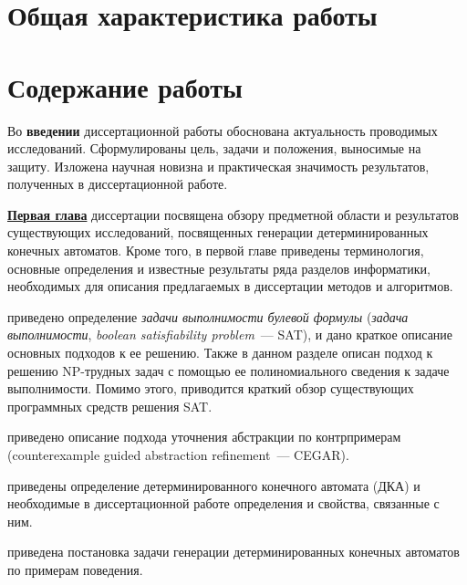 
\section*{Общая характеристика работы} %



\section*{Содержание работы}

Во \textbf{введении} диссертационной работы обоснована актуальность проводимых исследований. Сформулированы цель, задачи и положения, выносимые на защиту. Изложена научная новизна и практическая значимость результатов, полученных в диссертационной работе.


\textbf{\underline{Первая глава}} диссертации посвящена обзору предметной области и результатов существующих исследований, посвященных генерации детерминированных конечных автоматов.
Кроме того, в первой главе приведены терминология, основные определения и известные результаты ряда разделов информатики, необходимых для описания предлагаемых в диссертации методов и алгоритмов.

\insection{\ref{sec:review:sat}} приведено определение \emph{задачи выполнимости булевой формулы} (\emph{задача выполнимости}, \emph{boolean satisfiability problem}~{---} SAT), и дано краткое описание основных подходов к ее решению. 
Также в данном разделе описан подход к решению NP-трудных задач с помощью ее полиномиального сведения к задаче выполнимости.
Помимо этого, приводится краткий обзор существующих программных средств решения SAT.

\insection{\ref{sec:review:cegar}} приведено описание подхода уточнения абстракции по контрпримерам (counterexample guided abstraction refinement~{---} CEGAR).

\insection{\ref{sec:review:dfa-def}} приведены определение детерминированного конечного автомата (ДКА) и необходимые в диссертационной работе определения и свойства, связанные с ним.

\insection{\ref{sec:review:dfa-inf}} приведена постановка задачи генерации детерминированных конечных автоматов по примерам поведения.

